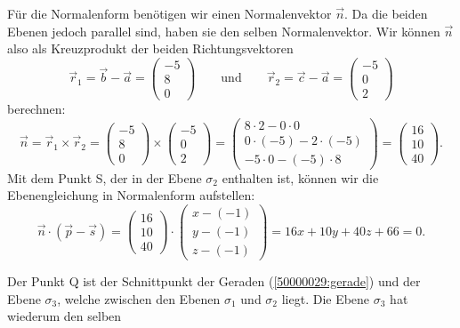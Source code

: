 \begin{loesung}
\begin{teilaufgaben}
\item
Für die Normalenform benötigen wir einen Normalenvektor $\vec n$. Da die 
beiden Ebenen jedoch parallel sind, haben sie den selben Normalenvektor.
Wir können $\vec n$ also als Kreuzprodukt der beiden Richtungsvektoren
\[
\vec r_1 = \vec b-\vec a = \begin{pmatrix}-5\\ 8\\ 0\end{pmatrix}
\qquad \text{und}\qquad 
\vec r_2 = \vec c-\vec a = \begin{pmatrix}-5\\ 0\\ 2\end{pmatrix}
\]
berechnen:
\[
\vec n = \vec r_1 \times \vec r_2 
= \begin{pmatrix}-5\\ 8\\ 0\end{pmatrix} \times \begin{pmatrix}-5\\ 0\\ 2\end{pmatrix} 
= \begin{pmatrix}8\cdot2 - 0\cdot 0\\ 0\cdot(-5) - 2\cdot (-5)\\ -5\cdot 0 - (-5)\cdot 8\end{pmatrix} 
= \begin{pmatrix}16\\ 10\\ 40\end{pmatrix}.
\]
Mit dem Punkt S, der in der Ebene $\sigma_2$ enthalten ist, können wir 
die Ebenengleichung in Normalenform aufstellen:
\[
  \vec n \cdot (\vec p -\vec s ) = 
  \begin{pmatrix}16\\ 10\\ 40\end{pmatrix} \cdot \begin{pmatrix}x-(-1)\\ y-(-1)\\ z-(-1)\end{pmatrix}
  = 16x + 10 y + 40 z +66 = 0.
\]
\item 
Der Punkt Q ist der Schnittpunkt der Geraden (\ref{50000029:gerade}) und der Ebene $\sigma_3$, welche 
zwischen den Ebenen $\sigma_1$ und $\sigma_2$ liegt. Die Ebene $\sigma_3$ hat wiederum den selben

\end{teilaufgaben}
\end{loesung}
